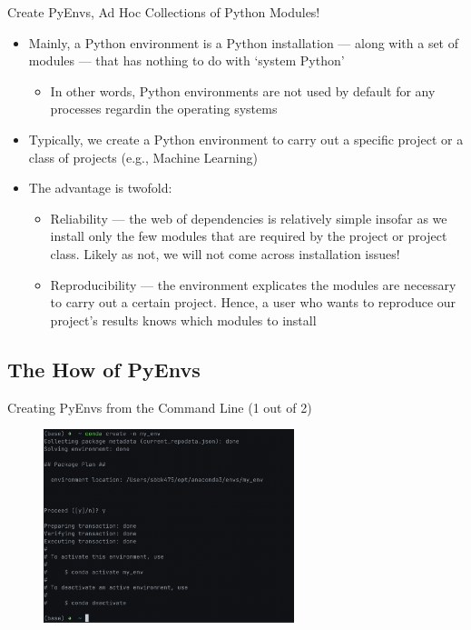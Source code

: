 \documentclass[aspectratio=1610]{beamer}
\begin{document}
\begin{frame}[c]{Create PyEnvs, Ad Hoc Collections of Python Modules!}
\begin{itemize}
	\item Mainly, a Python environment is a Python installation --- along with a set of modules --- that has nothing to do with `system Python'
	\begin{itemize}
		\item In other words, Python environments are not used by default for any processes regardin the operating systems
	\end{itemize}
	\item Typically, we create a Python environment to carry out a specific project or a class of projects (e.g., Machine Learning)
	\item The advantage is twofold:
	\begin{itemize}
		\item Reliability --- the web of dependencies is relatively simple insofar as we install only the few modules that are required by the project or project class. Likely as not, we will not come across installation issues!
		\item Reproducibility --- the environment explicates the modules are necessary to carry out a certain project. Hence, a user who wants to reproduce our project's results knows which modules to install
	\end{itemize}
	\end{itemize}
\end{frame}

\subsection{The How of PyEnvs}

\begin{frame}[c]{Creating PyEnvs from the Command Line (1 out of 2)}	
	\begin{figure}
		\includegraphics[width=0.65\textwidth]{images/conda_env_0}
	\end{figure}
\end{frame}
\end{document}
